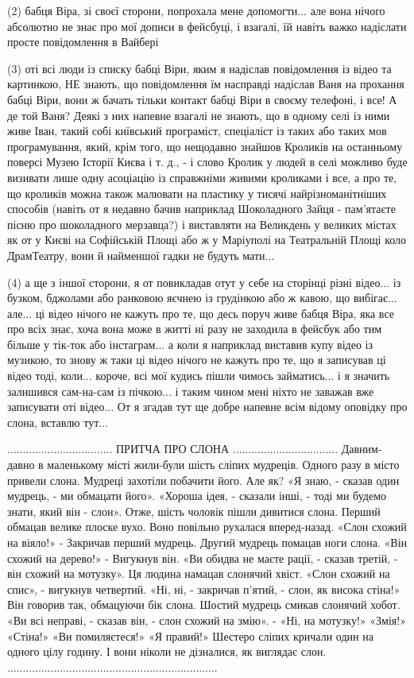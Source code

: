 (2) бабця Віра, зі своєї сторони, попрохала мене допомогти... але вона нічого
абсолютно не знає про мої дописи в фейсбуці, і взагалі, їй навіть важко
надіслати просте повідомлення в Вайбері

(3) оті всі люди із списку бабці Віри, яким я надіслав повідомлення із відео та
картинкою, НЕ знають, що повідомлення їм насправді надіслав Ваня на прохання
бабці Віри, вони ж бачать тільки контакт бабці Віри в своєму телефоні, і все! А
де той Ваня? Деякі з них напевне взагалі не знають, що в одному селі із ними
живе Іван, такий собі київський програміст, спеціаліст із таких або таких мов
програмування, який, крім того, що нещодавно знайшов Кроликів на останньому
поверсі Музею Історії Києва і т. д., - і слово Кролик у людей в селі можливо
буде визивати лише одну асоціацію із справжніми живими кроликами і все, а про
те, що кроликів можна також малювати на пластику у тисячі найрізноманітніших
способів (навіть от я недавно бачив наприклад Шоколадного Зайця - пам'ятаєте
пісню про шоколадного мерзавца?) і виставляти на Великдень у великих містах як
от у Києві на Софійській Площі  або ж у Маріуполі на Театральній Площі коло
ДрамТеатру, вони й найменшої гадки не будуть мати... 

(4) а ще з іншої сторони, я от повикладав отут у себе на сторінці різні
відео... із бузком, бджолами або ранковою яєчнею із грудінкою або ж кавою, що
вибігає... але...  ці відео нічого не кажуть про те, що десь поруч живе бабця
Віра, яка все про всіх знає, хоча вона може в житті ні разу не заходила в
фейсбук або тим більше у тік-ток або інстаграм... а коли я наприклад виставив
купу відео із музикою, то знову ж таки ці відео  нічого не кажуть про те, що я
записував ці відео тоді, коли...  короче, всі мої кудись пішли чимось
займатись... і я значить залишився сам-на-сам із пічкою...  і таким чином мені
ніхто не заважав вже записувати оті відео...  От я згадав тут ще добре напевне
всім відому оповідку про слона, вставлю тут...

.................................. ПРИТЧА ПРО СЛОНА ..................................  
Давним-давно в маленькому місті жили-були
шість сліпих мудреців. Одного разу в місто привели слона. Мудреці захотіли
побачити його. Але як? «Я знаю, - сказав один мудрець, - ми обмацати його».
«Хороша ідея, - сказали інші, - тоді ми будемо знати, який він - слон». Отже,
шість чоловік пішли дивитися слона. Перший обмацав велике плоске вухо. Воно
повільно рухалася вперед-назад. «Слон схожий на віяло!» - Закричав перший
мудрець. Другий мудрець помацав ноги слона. «Він схожий на дерево!» - Вигукнув
він. «Ви обидва не маєте рації, - сказав третій, - він схожий на мотузку». Ця
людина намацав слонячий хвіст. «Слон схожий на спис», - вигукнув четвертий.
«Ні, ні, - закричав п'ятий, - слон, як висока стіна!» Він говорив так,
обмацуючи бік слона. Шостий мудрець смикав слонячий хобот. «Ви всі неправі, -
сказав він, - слон схожий на змію». - «Ні, на мотузку!» «Змія!» «Стіна!» «Ви
помиляєтеся!» «Я правий!» Шестеро сліпих кричали один на одного цілу годину. І
вони ніколи не дізналися, як виглядає слон.
....................................................................

